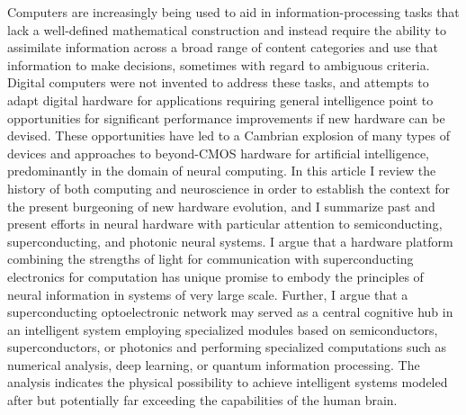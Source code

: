 Computers are increasingly being used to aid in information-processing tasks that lack a well-defined mathematical construction and instead require the ability to assimilate information across a broad range of content categories and use that information to make decisions, sometimes with regard to ambiguous criteria. Digital computers were not invented to address these tasks, and attempts to adapt digital hardware for applications requiring general intelligence point to opportunities for significant performance improvements if new hardware can be devised. These opportunities have led to a Cambrian explosion of many types of devices and approaches to beyond-CMOS hardware for artificial intelligence, predominantly in the domain of neural computing. In this article I review the history of both computing and neuroscience in order to establish the context for the present burgeoning of new hardware evolution, and I summarize past and present efforts in neural hardware with particular attention to semiconducting, superconducting, and photonic neural systems. I argue that a hardware platform combining the strengths of light for communication with superconducting electronics for computation has unique promise to embody the principles of neural information in systems of very large scale. Further, I argue that a superconducting optoelectronic network may served as a central cognitive hub in an intelligent system employing specialized modules based on semiconductors, superconductors, or photonics and performing specialized computations such as numerical analysis, deep learning, or quantum information processing. The analysis indicates the physical possibility to achieve intelligent systems modeled after but potentially far exceeding the capabilities of the human brain.